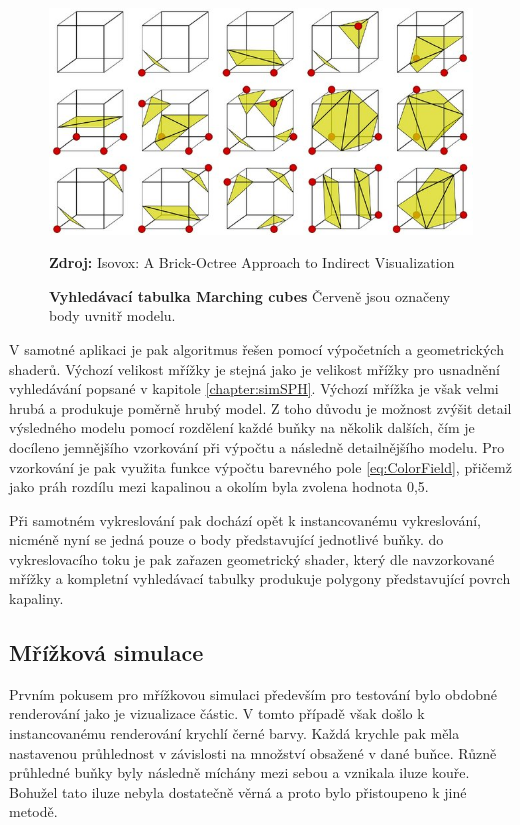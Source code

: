 \begin{figure}[hbt]
	\centering
	\captionsetup{justification=centering}
	\includegraphics[scale=0.5]{obrazky-figures/Look-up-table-for-the-Marching-Cubes-algorithm-13_W640.jpg}
	\caption{\textbf{Vyhledávací tabulka Marching cubes} Červeně jsou označeny body uvnitř modelu.}
	\textbf{Zdroj: } Isovox: A Brick-Octree Approach to Indirect Visualization \cite{isovox}
	\label{fig:EvapFlow}
\end{figure}

V samotné aplikaci je pak algoritmus řešen pomocí výpočetních a geometrických shaderů. Výchozí velikost mřížky je stejná jako je velikost mřížky pro usnadnění vyhledávání popsané v kapitole \ref{chapter:simSPH}. Výchozí mřížka je však velmi hrubá a produkuje poměrně hrubý model. Z toho důvodu je možnost zvýšit detail výsledného modelu pomocí rozdělení každé buňky na několik dalších, čím je docíleno jemnějšího vzorkování při výpočtu a následně detailnějšího modelu. Pro vzorkování je pak využita funkce výpočtu barevného pole \ref{eq:ColorField}, přičemž jako práh rozdílu mezi kapalinou a okolím byla zvolena hodnota 0,5.

Při samotném vykreslování pak dochází opět k instancovanému vykreslování, nicméně nyní se jedná pouze o body představující jednotlivé buňky. do vykreslovacího toku je pak zařazen geometrický shader, který dle navzorkované mřížky a kompletní vyhledávací tabulky produkuje polygony představující povrch kapaliny.

\subsection{Mřížková simulace}
\label{chapter:vizGrid}
Prvním pokusem pro mřížkovou simulaci především pro testování bylo obdobné renderování jako je vizualizace částic. V tomto případě však došlo k instancovanému renderování krychlí černé barvy. Každá krychle pak měla nastavenou průhlednost v závislosti na množství obsažené v dané buňce. Různě průhledné buňky byly následně míchány mezi sebou a vznikala iluze kouře. Bohužel tato iluze nebyla dostatečně věrná a proto bylo přistoupeno k jiné metodě.

